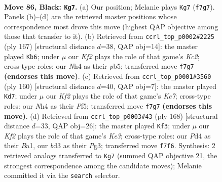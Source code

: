 \documentclass[11pt]{article}
\begin{document}
\clearpage

\begin{figure}[p]\centering
\begin{subfigure}{0.46\textwidth}\centering
\resizebox{\linewidth}{!}{%
\newchessgame
\chessboard[
  setfen={8/1Nn2k2/8/p7/Pb1pP2n/1P1B3p/1K2P3/8 b - - 39 86},
  showmover=false,
  pgfstyle=straightmove, color=movearrow, markmove={f7-g7}
]}
\caption{}
\end{subfigure}\hfill
\begin{subfigure}{0.46\textwidth}\centering
\resizebox{\linewidth}{!}{%
\newchessgame
\chessboard[
  setfen={8/2k3p1/5nPp/1Pp4P/2b5/2N1KB2/8/8 b - - 16 84},
  showmover=false,
  pgfstyle=straightmove, color=movearrow, markmove={c7-b6}
]}
\caption{}
\end{subfigure}
\\[4pt]
\begin{subfigure}{0.46\textwidth}\centering
\resizebox{\linewidth}{!}{%
\newchessgame
\chessboard[
  setfen={8/k3K3/1p3p2/5Pb1/PP4Pp/8/6B1/8 w - - 19 81},
  showmover=false,
  pgfstyle=straightmove, color=movearrow, markmove={e7-d7}
]}
\caption{}
\end{subfigure}\hfill
\begin{subfigure}{0.46\textwidth}\centering
\resizebox{\linewidth}{!}{%
\newchessgame
\chessboard[
  setfen={6k1/1B3p2/Pb4p1/2p1P2p/2b4P/4K1P1/8/B7 w - - 45 85},
  showmover=false,
  pgfstyle=straightmove, color=movearrow, markmove={e3-f3}
]}
\caption{}
\end{subfigure}
\caption{\textbf{Move 86, Black: \texttt{Kg7}.} (a) Our position; Melanie plays \texttt{Kg7} (\texttt{f7g7}). Panels (b)--(d) are the retrieved master positions whose correspondence most drove this move (highest QAP objective among those that transfer to it). (b) Retrieved from \texttt{ccrl\_top\_p0002\#2225} (ply 167) [structural distance $d$=38, QAP obj=14]: the master played \texttt{Kb6}; under $\mu$ our \emph{Kf2} plays the role of that game's \emph{Kc2}; cross-type roles: our \emph{N}h4 as their \emph{p}b5; transferred move \texttt{f7g7} \textbf{(endorses this move)}. (c) Retrieved from \texttt{ccrl\_top\_p0001\#3560} (ply 160) [structural distance $d$=40, QAP obj=7]: the master played \texttt{Kd7}; under $\mu$ our \emph{Kf2} plays the role of that game's \emph{Ke7}; cross-type roles: our \emph{N}h4 as their \emph{P}f5; transferred move \texttt{f7g7} \textbf{(endorses this move)}. (d) Retrieved from \texttt{ccrl\_top\_p0003\#43} (ply 168) [structural distance $d$=33, QAP obj=26]: the master played \texttt{Kf3}; under $\mu$ our \emph{Kf2} plays the role of that game's \emph{Ke3}; cross-type roles: our \emph{P}d4 as their \emph{B}a1, our \emph{b}d3 as their \emph{P}g3; transferred move \texttt{f7f6}. Synthesis: 2 retrieved analogs transferred to \texttt{Kg7} (summed QAP objective 21, the strongest correspondence among the candidate moves); Melanie committed it via the \texttt{search} selector.}
\label{fig:thought-m171}
\end{figure}
\end{document}
